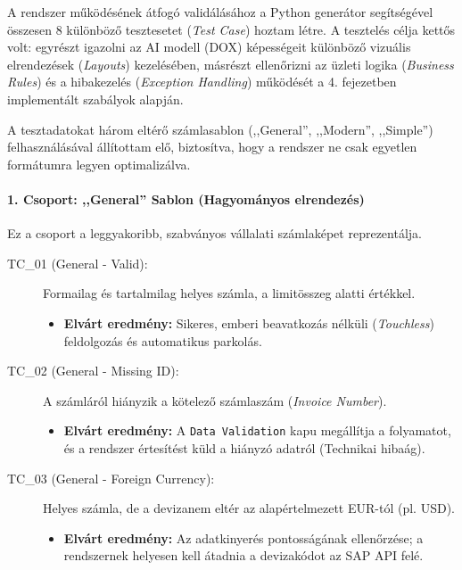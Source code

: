 A rendszer működésének átfogó validálásához a Python generátor segítségével összesen 8 különböző tesztesetet (\textit{Test Case}) hoztam létre. A tesztelés célja kettős volt: egyrészt igazolni az AI modell (DOX) képességeit különböző vizuális elrendezések (\textit{Layouts}) kezelésében, másrészt ellenőrizni az üzleti logika (\textit{Business Rules}) és a hibakezelés (\textit{Exception Handling}) működését a 4. fejezetben implementált szabályok alapján.

A tesztadatokat három eltérő számlasablon (,,General'', ,,Modern'', ,,Simple'') felhasználásával állítottam elő, biztosítva, hogy a rendszer ne csak egyetlen formátumra legyen optimalizálva.

\paragraph{1. Csoport: ,,General'' Sablon (Hagyományos elrendezés)}
Ez a csoport a leggyakoribb, szabványos vállalati számlaképet reprezentálja.

\begin{description}
    \item[TC\_01 (General - Valid):] Formailag és tartalmilag helyes számla, a limitösszeg alatti értékkel.
    \begin{itemize}
        \item \textbf{Elvárt eredmény:} Sikeres, emberi beavatkozás nélküli (\textit{Touchless}) feldolgozás és automatikus parkolás.
    \end{itemize}
    
    \item[TC\_02 (General - Missing ID):] A számláról hiányzik a kötelező számlaszám (\textit{Invoice Number}).
    \begin{itemize}
        \item \textbf{Elvárt eredmény:} A \texttt{Data Validation} kapu megállítja a folyamatot, és a rendszer értesítést küld a hiányzó adatról (Technikai hibaág).
    \end{itemize}
    
    \item[TC\_03 (General - Foreign Currency):] Helyes számla, de a devizanem eltér az alapértelmezett EUR-tól (pl. USD).
    \begin{itemize}
        \item \textbf{Elvárt eredmény:} Az adatkinyerés pontosságának ellenőrzése; a rendszernek helyesen kell átadnia a devizakódot az SAP API felé.
    \end{itemize}
\end{description}

